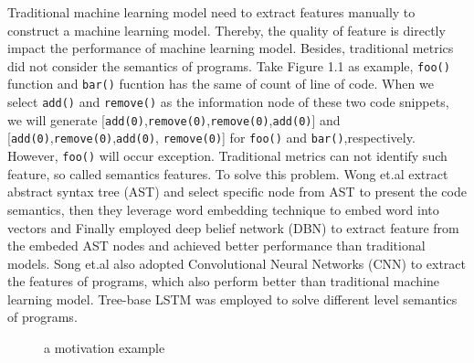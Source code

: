 Traditional machine learning model need to extract features manually to construct a machine learning model. Thereby, the quality of feature is directly impact the performance of machine learning model. Besides, traditional metrics did not consider the semantics of programs. Take Figure 1.1 as example, \texttt{foo()} function and \texttt{bar()} fucntion has the same of count of line of code. When we select \texttt{add()} and \texttt{remove()} as the information node of these two code snippets, we will generate [\texttt{add(0)},\texttt{remove(0)},\texttt{remove(0)},\texttt{add(0)}] and [\texttt{add(0)},\texttt{remove(0)},\texttt{add(0)},
\texttt{remove(0)}] for \texttt{foo()} and \texttt{bar()},respectively. However, \texttt{foo()} will occur exception. Traditional metrics can not identify such feature, so called semantics features. To solve this problem. Wong et.al \cite{} extract abstract syntax tree (AST) and select specific node from AST to present the code semantics, then they leverage word embedding technique to embed word into vectors and Finally employed deep belief network (DBN) \cite{} to extract feature from the embeded AST nodes and achieved better performance than traditional models. Song et.al also adopted Convolutional Neural Networks (CNN) to extract the features of programs, which also perform better than traditional machine learning model. Tree-base LSTM was employed to solve different level semantics of programs.\\

\begin{figure}
    \centering
    \caption{a motivation example}
\end{figure}

